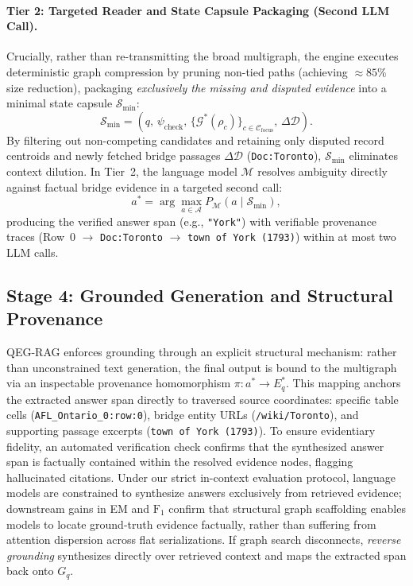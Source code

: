 \documentclass[runningheads]{llncs}
\begin{document}
\paragraph{Tier 2: Targeted Reader and State Capsule Packaging (Second LLM Call).}
Crucially, rather than re-transmitting the broad multigraph, the engine executes deterministic graph compression by pruning non-tied paths (achieving $\approx 85\%$ size reduction), packaging \emph{exclusively the missing and disputed evidence} into a minimal state capsule $\mathcal{S}_{\min}$:
\begin{equation}
\label{eq:l2-capsule}
\mathcal{S}_{\min} = \left( q, \, \psi_{\text{check}}, \, \{ \mathcal{G}^*(\rho_c) \}_{c \in \mathcal{C}_{\text{focus}}}, \, \Delta \mathcal{D} \right).
\end{equation}
By filtering out non-competing candidates and retaining only disputed record centroids and newly fetched bridge passages $\Delta \mathcal{D}$ (\texttt{Doc:Toronto}), $\mathcal{S}_{\min}$ eliminates context dilution. In Tier~2, the language model $\mathcal{M}$ resolves ambiguity directly against factual bridge evidence in a targeted second call:
\begin{equation}
a^* = \arg\max_{a \in \mathcal{A}} P_{\mathcal{M}}(a \mid \mathcal{S}_{\min}),
\end{equation}
producing the verified answer span (e.g., \texttt{"York"}) with verifiable provenance traces (Row~0 $\to$ \texttt{Doc:Toronto} $\to$ \texttt{town of York (1793)}) within at most two LLM calls.

\subsection{Stage 4: Grounded Generation and Structural Provenance}
\label{sec:method-answer}
QEG-RAG enforces grounding through an explicit structural mechanism: rather than unconstrained text generation, the final output is bound to the multigraph via an inspectable provenance homomorphism $\pi: a^* \rightarrow E_q^*$. This mapping anchors the extracted answer span directly to traversed source coordinates: specific table cells (\texttt{AFL\_Ontario\_0:row:0}), bridge entity URLs (\texttt{/wiki/Toronto}), and supporting passage excerpts (\texttt{town of York (1793)}). To ensure evidentiary fidelity, an automated verification check confirms that the synthesized answer span is factually contained within the resolved evidence nodes, flagging hallucinated citations. Under our strict in-context evaluation protocol, language models are constrained to synthesize answers exclusively from retrieved evidence; downstream gains in EM and $\text{F}_1$ confirm that structural graph scaffolding enables models to locate ground-truth evidence factually, rather than suffering from attention dispersion across flat serializations. If graph search disconnects, \emph{reverse grounding} synthesizes directly over retrieved context and maps the extracted span back onto $G_q$.
\end{document}
